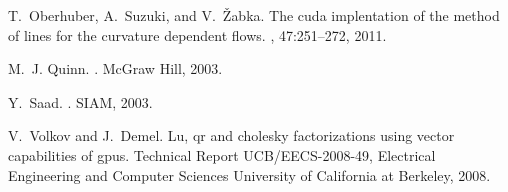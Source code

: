 \documentclass{pj}
\begin{document}
\begin{thebibliography}{99}
T.~Oberhuber, A.~Suzuki, and V.~{\v Z}abka.
\newblock The cuda implentation of the method of lines for the curvature
  dependent flows.
, 47:251--272, 2011.

M.~J. Quinn.
.
\newblock McGraw Hill, 2003.

Y.~Saad.
.
\newblock SIAM, 2003.

V.~Volkov and J.~Demel.
\newblock Lu, qr and cholesky factorizations using vector capabilities of gpus.
\newblock Technical Report UCB/EECS-2008-49, Electrical Engineering and
  Computer Sciences University of California at Berkeley, 2008.

\end{thebibliography}
\end{document}
